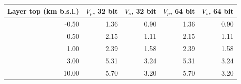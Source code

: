 \begin{longtable}{rrrrr}\toprule Layer top (km b.s.l.) & $V_p$, 32 bit & $V_s$, 32 bit & $V_p$, 64 bit & $V_s$, 64 bit\\\midrule\endhead
-0.50 & 1.36 & 0.90 & 1.36 & 0.90\\
0.50 & 2.15 & 1.11 & 2.15 & 1.11\\
1.00 & 2.39 & 1.58 & 2.39 & 1.58\\
3.00 & 5.31 & 3.24 & 5.31 & 3.24\\
10.00 & 5.70 & 3.20 & 5.70 & 3.20\\
\bottomrule\end{longtable}

